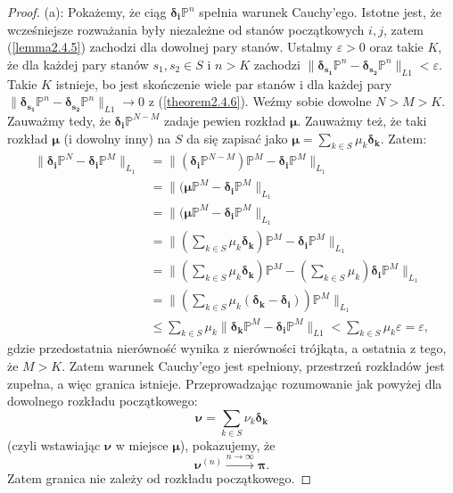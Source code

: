 \documentclass[a4paper]{article}
\theoremstyle{defn}
\theoremstyle{theorem}
\theoremstyle{lemma}
\theoremstyle{cor}
\theoremstyle{fact}
\begin{document}
\begin{proof}
(a): Pokażemy, że ciąg $\boldsymbol{\delta_i}\mathbb{P}^n$ spełnia warunek Cauchy'ego. Istotne jest, że wcześniejsze rozważania były niezależne od stanów początkowych $i, j$, zatem (\ref{lemma2.4.5}) zachodzi dla dowolnej pary stanów. Ustalmy $\varepsilon > 0$ oraz takie $K$, że dla każdej pary stanów $s_1, s_2 \in S$ i $n > K$  zachodzi $\|\boldsymbol{\delta_{s_1}}\mathbb{P}^n - \boldsymbol{\delta_{s_2}}\mathbb{P}^n\|_{L1} < \varepsilon$. Takie $K$ istnieje, bo jest skończenie wiele par stanów i dla każdej pary $\|\boldsymbol{\delta_{s_1}}\mathbb{P}^n - \boldsymbol{\delta_{s_2}}\mathbb{P}^n\|_{L1} \to 0$ z (\ref{theorem2.4.6}). Weźmy sobie dowolne $N > M > K$. Zauważmy tedy, że $\boldsymbol{\delta_i}\mathbb{P}^{N-M}$ zadaje pewien rozkład $\boldsymbol{\mu}$. Zauważmy też, że taki rozkład $\boldsymbol{\mu}$ (i dowolny inny) na $S$ da się zapisać jako $\boldsymbol{\mu} = \sum\limits_{k \in S} \mu_k\boldsymbol{\delta_k}$. Zatem:
\begin{align*}
\|\boldsymbol{\delta_i}\mathbb{P}^N - \boldsymbol{\delta_i}\mathbb{P}^M\|_{L_1} &= \|(\boldsymbol{\delta_i}\mathbb{P}^{N-M})\mathbb{P}^{M} - \boldsymbol{\delta_i}\mathbb{P}^M\|_{L_1}\\  
&= \|(\boldsymbol{\mu}\mathbb{P}^{M} - \boldsymbol{\delta_i}\mathbb{P}^M\|_{L_1} \\ 
&= \|(\boldsymbol{\mu}\mathbb{P}^{M} - \boldsymbol{\delta_i}\mathbb{P}^M\|_{L_1} \\
&= \|(\sum\limits_{k \in S} \mu_k\boldsymbol{\delta_k})\mathbb{P}^{M} - \boldsymbol{\delta_i}\mathbb{P}^M\|_{L_1} \\
&= \|(\sum\limits_{k \in S} \mu_k\boldsymbol{\delta_k})\mathbb{P}^{M} - (\sum\limits_{k \in S} \mu_k)\boldsymbol{\delta_i}\mathbb{P}^M\|_{L_1} \\
&= \|(\sum\limits_{k \in S} \mu_k(\boldsymbol{\delta_k} - \boldsymbol{\delta_i}))\mathbb{P}^{M}\|_{L_1}  \\
&\leq  \sum\limits_{k \in S} \mu_k\|\boldsymbol{\delta_k}\mathbb{P}^M - \boldsymbol{\delta_i}\mathbb{P}^M\|_{L1} < \sum\limits_{k \in S} \mu_k\varepsilon = \varepsilon,
\end{align*}
gdzie przedostatnia nierówność wynika z nierówności trójkąta, a ostatnia z tego, że $M > K$. Zatem warunek Cauchy'ego jest spełniony, przestrzeń rozkładów jest zupełna, a więc granica istnieje. Przeprowadzając rozumowanie jak powyżej dla dowolnego rozkładu początkowego: $$\boldsymbol{\nu} = \sum\limits_{k \in S} \nu_k\boldsymbol{\delta_k}$$ (czyli wstawiając $\boldsymbol{\nu}$ w miejsce $\boldsymbol{\mu}$), pokazujemy, że $$\boldsymbol{\nu}^{(n)} \xrightarrow{n \to \infty} \boldsymbol{\pi}.$$ Zatem granica nie zależy od rozkładu początkowego.
\end{proof}
\end{document}
